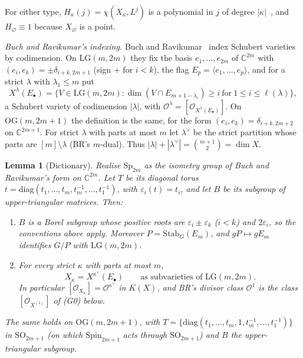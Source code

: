\documentclass[11pt]{amsart}
\newtheorem{lemma}[theorem]{Lemma}
\theoremstyle{definition}
\theoremstyle{remark}
\newcommand{\LG}{\mathrm{LG}}
\newcommand{\OG}{\mathrm{OG}}
\newcommand{\cO}{\mathcal{O}}
\newcommand{\C}{\mathbb{C}}
\begin{document}
For either type, $H_\kappa(j)=\chi(X_\kappa,L^j)$ is a polynomial in $j$ of degree
$|\kappa|$~\cite{Kleiman66}, and $H_\varnothing\equiv1$ because $X_\varnothing$ is a point.

\emph{Buch and Ravikumar's indexing.} Buch and Ravikumar~\cite[\S\S4--5]{BR12} index
Schubert varieties by codimension. On $\LG(m,2m)$ they fix the basis $e_1,\dots,e_{2m}$ of
$\C^{2m}$ with $(e_i,e_k)=\pm\delta_{i+k,2m+1}$ (sign $+$ for $i<k$), the flag
$E_p=\langle e_1,\dots,e_p\rangle$, and for a strict $\lambda$ with $\lambda_1\le m$ put
\[ X^\lambda(E_\bullet)=\{V\in\LG(m,2m):\dim(V\cap E_{m+1-\lambda_i})\ge i\ \text{for}\
1\le i\le\ell(\lambda)\}, \]
a Schubert variety of codimension $|\lambda|$, with
$\cO^\lambda=[\cO_{X^\lambda(E_\bullet)}]$. On $\OG(m,2m+1)$ the definition is the same, for
the form $(e_i,e_k)=\delta_{i+k,2m+2}$ on $\C^{2m+1}$. For strict $\lambda$ with parts at most
$m$ let $\lambda^\vee$ be the strict partition whose parts are $[m]\setminus\lambda$ (BR's
$m$-dual). Thus $|\lambda|+|\lambda^\vee|=\binom{m+1}2=\dim X$.

\begin{lemma}[Dictionary]\label{lem:dictionary}
Realise $\mathrm{Sp}_{2m}$ as the isometry group of Buch and Ravikumar's form on $\C^{2m}$.
Let $T$ be its diagonal torus $t=\mathrm{diag}(t_1,\dots,t_m,t_m^{-1},\dots,t_1^{-1})$, with
$\varepsilon_i(t)=t_i$, and let $B$ be its subgroup of upper-triangular matrices. Then:
\begin{enumerate}[label=(\alph*)]
\item $B$ is a Borel subgroup whose positive roots are $\varepsilon_i\pm\varepsilon_k$ ($i<k$)
and $2\varepsilon_i$, so the conventions above apply. Moreover $P=\mathrm{Stab}_G(E_m)$, and
$gP\mapsto gE_m$ identifies $G/P$ with $\LG(m,2m)$.
\item For every strict $\kappa$ with parts at most $m$,
\[ X_\kappa=X^{\kappa^\vee}(E_\bullet)\qquad\text{as subvarieties of }\LG(m,2m). \]
In particular $[\cO_{X_\kappa}]=\cO^{\kappa^\vee}$ in $K(X)$, and BR's divisor class $\cO^1$
is the class $[\cO_{X^{(1)}}]$ of (G0) below.
\end{enumerate}
The same holds on $\OG(m,2m+1)$, with $T=\{\mathrm{diag}(t_1,\dots,t_m,1,t_m^{-1},\dots,t_1^{-1})\}$
in $\mathrm{SO}_{2m+1}$ (on which $\mathrm{Spin}_{2m+1}$ acts through $\mathrm{SO}_{2m+1}$) and $B$
the upper-triangular subgroup.
\end{lemma}
\end{document}
